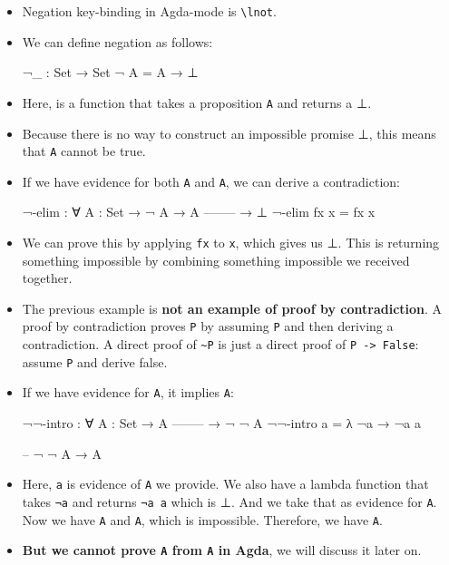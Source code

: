 \documentclass{lecturenotes}
\newcommand{\agdaempty}{\textsf{⊥}\xspace}
\begin{document}
\begin{itemize}
\item Negation key-binding in Agda-mode is \texttt{\textbackslash lnot}. 
\item We can define negation as follows:
\begin{code}
¬_ : Set → Set
¬ A = A → ⊥
\end{code}
\item Here, \texttt{\lnot} is a function that takes a proposition \texttt{A} and returns a \agdaempty.
\item Because there is no way to construct an impossible promise \agdaempty, this means that \texttt{A} cannot be true.

\item If we have evidence for both \texttt{\lnot A} and \texttt{A}, we can derive a contradiction:
\begin{code}
¬-elim : ∀ {A : Set}
    → ¬ A
    → A
    --------
    → ⊥
¬-elim fx x = fx x
\end{code}
\item We can prove this by applying \texttt{fx} to \texttt{x}, which gives us \agdaempty.
      This is returning something impossible by combining something impossible we received together.

\item The previous example is \textbf{not an example of proof by contradiction}.
      A proof by contradiction proves \texttt{P} by assuming \texttt{\lnot P} and then deriving a contradiction. 
      A direct proof of \texttt{\sim P} is just a direct proof of \texttt{P -> False}: assume \texttt{P} and derive false.

\item If we have evidence for \texttt{A}, it implies \texttt{\lnot \lnot A}:
\begin{code}
¬¬-intro : ∀ {A : Set}
    → A
    --------
    → ¬ ¬ A
¬¬-intro a = λ {¬a → ¬a a}

-- ¬ ¬ A → A
\end{code}
\item Here, \texttt{a} is evidence of \texttt{A} we provide. We also have a lambda function that 
      takes \texttt{¬a} and returns \texttt{¬a a} which is \agdaempty. And we take that as evidence for \texttt{\lnot A}. 
      Now we have \texttt{A} and \texttt{\lnot A}, which is impossible. Therefore, we have \texttt{\lnot \lnot A}.
\item \textbf{But we cannot prove \texttt{A} from \texttt{\lnot \lnot A} in Agda}, we will discuss it later on.


\end{itemize}
\end{document}
